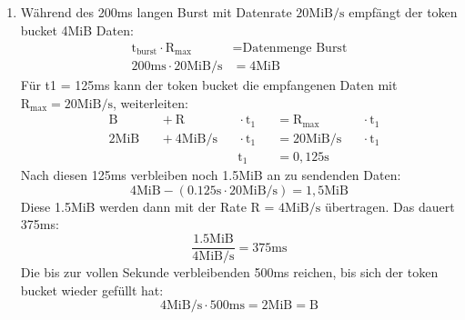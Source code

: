 \documentclass[a4paper,
			llpt,
			solution,
			accentcolor=tud2d,
			colorbacktitle
			]
			{tudexercise}
\newcommand{\MiBs}{\mathrm{MiB}/\mathrm{s}}
\begin{document}
\subsection{}
\begin{enumerate}
\item
\begin{multicols}{2}
Während des 200ms langen Burst mit Datenrate $20\MiBs$ empfängt der token bucket 4MiB Daten:
\begin{align*}
\text{t}_\text{burst}  \cdot \text{R}_\text{max} &= \text{Datenmenge Burst}
\\
200\mathrm{ms} \cdot 20\MiBs &= \mathrm{4MiB}
\end{align*}
Für t1 = 125ms kann der token bucket die empfangenen Daten mit $\mathrm{R}_{\mathrm{max}} = 20\MiBs$, weiterleiten:
\begin{alignat*}{5}
&\mathrm{B}     &&{}+ \mathrm{R} &&{}\cdot  \mathrm{t}_1 &&{}= \mathrm{R}_{\mathrm{max}} &&{}\cdot  \mathrm{t}_1 \\
& 2\mathrm{MiB} &&{}+ 4\MiBs &&{}\cdot   \mathrm{t}_1 &&{}= 20\MiBs &&{}\cdot  \mathrm{t}_1\\
&               &&{}         &&{}      \mathrm{t}_1 &&{}= 0,125\mathrm{s} &&{}
\end{alignat*}
Nach diesen 125ms verbleiben noch 1.5MiB an zu sendenden Daten:
$$4\mathrm{MiB} - \left(0.125\mathrm{s} \cdot 20\MiBs\right) = 1,5 \mathrm{MiB}$$
Diese 1.5MiB werden dann mit der Rate R = $4\MiBs
$
übertragen. Das dauert 375ms:
$$
\frac{1.5 \mathrm{MiB}}{ 4 \MiBs} = 375\mathrm{ms}
$$
Die bis zur vollen Sekunde verbleibenden 500ms reichen, bis sich der token bucket wieder gefüllt hat:
$$
4\MiBs \cdot 500\mathrm{ms} = 2\mathrm{MiB} = \mathrm{B}
$$
\vfill
\columnbreak


\end{multicols}
\end{enumerate}
\end{document}

